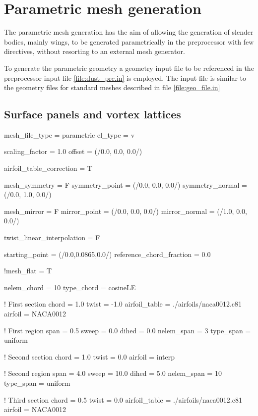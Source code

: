 \section{Parametric mesh generation}
\label{sec:Parametric_mesh_generation}

The parametric mesh generation has the aim of allowing the generation of slender bodies, mainly wings, to be generated parametrically in the preprocessor with few directives, without resorting to an external mesh generator. 

To generate the parametric geometry a geometry input file to be referenced in the preprocessor input file \ref{file:dust_pre.in} is employed. The input file is similar to the geometry files for standard meshes described in file \ref{file:geo_file.in}


\subsection{Surface panels and vortex lattices}

\begin{inputfile}[frame=single, caption={paramtetric\_geo\_file.in}, label={file:parametric_geo_file.in}]
mesh_file_type = parametric
el_type = v

scaling_factor = 1.0
offset = (/0.0, 0.0, 0.0/)

airfoil_table_correction = T

mesh_symmetry = F
symmetry_point  = (/0.0, 0.0, 0.0/)
symmetry_normal = (/0.0, 1.0, 0.0/)

mesh_mirror = F
mirror_point  = (/0.0, 0.0, 0.0/)
mirror_normal = (/1.0, 0.0, 0.0/)

twist_linear_interpolation = F

starting_point = (/0.0,0.0865,0.0/)
reference_chord_fraction = 0.0

!mesh_flat = T

nelem_chord = 10
type_chord = cosineLE

! First section
chord = 1.0
twist = -1.0
airfoil_table = ./airfoils/naca0012.c81
airfoil = NACA0012

! First region
span = 0.5
sweep = 0.0
dihed = 0.0
nelem_span = 3 
type_span = uniform

! Second section
chord = 1.0
twist = 0.0
airfoil = interp

! Second region
span = 4.0
sweep = 10.0
dihed = 5.0
nelem_span = 10 
type_span = uniform

! Third section
chord = 0.5
twist =  0.0
airfoil_table = ./airfoils/naca0012.c81
airfoil = NACA0012

\end{inputfile}


